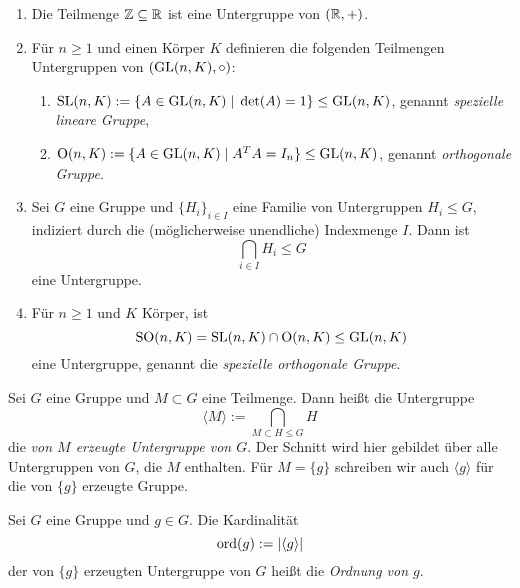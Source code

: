 \documentclass{book}
\begin{document}
\begin{exas}
\label{exas:untergruppen}
    \begin{enumerate}
        \item Die Teilmenge $\mathbb{Z} \subseteq \mathbb{R}$ ist eine Untergruppe von $(\mathbb{R},+)$. 
        \item Für $n \ge 1$ und einen Körper $K$ definieren die folgenden Teilmengen Untergruppen von $(\operatorname{GL}(n,K), \circ)$:
            \begin{enumerate}
                \item $\operatorname{SL}(n,K) := \{A \in \operatorname{GL}(n,K)\;  | \; \det(A) = 1 \} \leq \operatorname{GL}(n,K)$, genannt {\em spezielle lineare Gruppe},
                \item $\operatorname{O}(n,K) := \{A \in \operatorname{GL}(n,K)\; | \; A^TA = I_n \} \leq \operatorname{GL}(n,K)$, genannt {\em orthogonale Gruppe}.
            \end{enumerate}
        \item Sei $G$ eine Gruppe und $\{H_i\}_{i \in I}$ eine Familie von Untergruppen $H_i
            \leq G$, indiziert durch die (möglicherweise unendliche) Indexmenge $I$. Dann ist
            \[
                \bigcap_{i \in I} H_i \leq G
            \]
            eine Untergruppe. 
        \item Für $n \ge 1$ und $K$ Körper, ist 
            \[
                \operatorname{SO}(n,K) = \operatorname{SL}(n,K) \cap \operatorname{O}(n,K) \leq \operatorname{GL}(n,K)
            \]
            eine Untergruppe, genannt die {\em spezielle orthogonale Gruppe}.
    \end{enumerate}
\end{exas}


\begin{defi}
\label{defi:erzeugte} 
Sei $G$ eine Gruppe und $M \subset G$ eine Teilmenge. Dann heißt die
Untergruppe
\[
    \langle M \rangle := \bigcap_{M \subset H \leq G} H
\]
die {\em von $M$ erzeugte Untergruppe von $G$}. Der Schnitt wird hier gebildet
über alle Untergruppen von $G$, die $M$ enthalten. Für $M = \{g\}$ schreiben
wir auch $\langle g \rangle$ für die von $\{g\}$ erzeugte Gruppe. 
\end{defi}

\begin{defi}
\label{defi:ordnung}
    Sei $G$ eine Gruppe und $g \in G$. Die Kardinalität
    \[
        \operatorname{ord}(g) := | \langle g \rangle |
    \]
    der von $\{g\}$ erzeugten Untergruppe von $G$ heißt die {\em Ordnung von $g$}. 
\end{defi}
\end{document}

